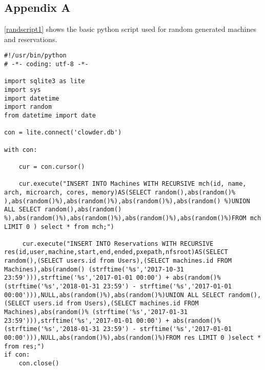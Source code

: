 
\nocite{*}


\begin{appendices}
\chapter{Appendix A}
\autoref{randscript1} shows the basic python script used for random generated machines and reservations.
\lstset{basicstyle=\footnotesize\ttfamily,breaklines=true}
\lstset{framextopmargin=50pt,frame=bottomline}
\begin{lstlisting}[caption=Script for generated data, label=randscript1]
#!/usr/bin/python
# -*- coding: utf-8 -*-

import sqlite3 as lite
import sys
import datetime
import random
from datetime import date

con = lite.connect('clowder.db')

with con:

    cur = con.cursor()

    cur.execute("INSERT INTO Machines WITH RECURSIVE mch(id, name, arch, microarch, cores, memory)AS(SELECT random(),abs(random()% ),abs(random()%),abs(random()%),abs(random()%),abs(random() %)UNION ALL SELECT random(),abs(random() %),abs(random()%),abs(random()%),abs(random()%),abs(random()%)FROM mch LIMIT 0 ) select * from mch;")
    
     cur.execute("INSERT INTO Reservations WITH RECURSIVE res(id,user,machine,start,end,ended,pxepath,nfsroot)AS(SELECT random(),(SELECT users.id from Users),(SELECT machines.id FROM Machines),abs(random() (strftime('%s','2017-10-31 23:59'))),strftime('%s','2017-01-01 00:00') + abs(random()% (strftime('%s','2018-01-31 23:59') - strftime('%s','2017-01-01 00:00'))),NULL,abs(random()%),abs(random()%)UNION ALL SELECT random(),(SELECT users.id from Users),(SELECT machines.id FROM Machines),abs(random()% (strftime('%s','2017-01-31 23:59'))),strftime('%s','2017-01-01 00:00') + abs(random()% (strftime('%s','2018-01-31 23:59') - strftime('%s','2017-01-01 00:00'))),NULL,abs(random()%),abs(random()%)FROM res LIMIT 0 )select * from res;")
if con:
    con.close()

\end{lstlisting}

\end{appendices}

